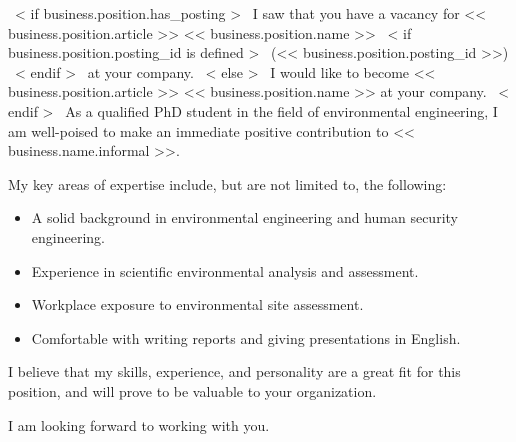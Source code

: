 ~< if business.position.has_posting >~
    I saw that you have a vacancy for << business.position.article >> << business.position.name >>
    ~< if business.position.posting_id is defined >~ (<< business.position.posting_id >>) ~< endif >~ at your company.
~< else >~
    I would like to become << business.position.article >> << business.position.name >> at your company.
~< endif >~
As a qualified PhD student in the field of environmental engineering, I am well-poised to make an immediate positive contribution to << business.name.informal >>.

My key areas of expertise include, but are not limited to, the following:

\begin{itemize}
    \item A solid background in environmental engineering and human security engineering.
	\item Experience in scientific environmental analysis and assessment.
	\item Workplace exposure to environmental site assessment.
	\item Comfortable with writing reports and giving presentations in English.
\end{itemize}


I believe that my skills, experience, and personality are a great fit for this position, and will prove to be valuable to your organization.

I am looking forward to working with you.
